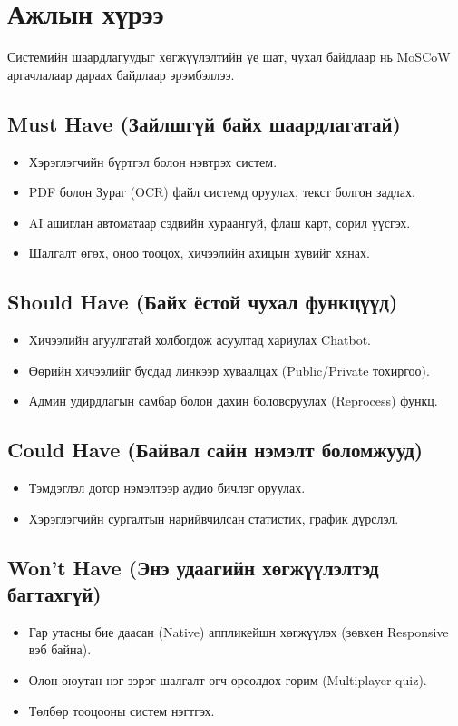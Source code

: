 \section{Ажлын хүрээ}
Системийн шаардлагуудыг хөгжүүлэлтийн үе шат, чухал байдлаар нь MoSCoW аргачлалаар дараах байдлаар эрэмбэллээ.

\subsection{Must Have (Зайлшгүй байх шаардлагатай)}
\begin{itemize}
    \item Хэрэглэгчийн бүртгэл болон нэвтрэх систем.
    \item PDF болон Зураг (OCR) файл системд оруулах, текст болгон задлах.
    \item AI ашиглан автоматаар сэдвийн хураангуй, флаш карт, сорил үүсгэх.
    \item Шалгалт өгөх, оноо тооцох, хичээлийн ахицын хувийг хянах.
\end{itemize}

\subsection{Should Have (Байх ёстой чухал функцүүд)}
\begin{itemize}
    \item Хичээлийн агуулгатай холбогдож асуултад хариулах Chatbot.
    \item Өөрийн хичээлийг бусдад линкээр хуваалцах (Public/Private тохиргоо).
    \item Админ удирдлагын самбар болон дахин боловсруулах (Reprocess) функц.
\end{itemize}

\subsection{Could Have (Байвал сайн нэмэлт боломжууд)}
\begin{itemize}
    \item Тэмдэглэл дотор нэмэлтээр аудио бичлэг оруулах.
    \item Хэрэглэгчийн сургалтын нарийвчилсан статистик, график дүрслэл.
\end{itemize}

\subsection{Won't Have (Энэ удаагийн хөгжүүлэлтэд багтахгүй)}
\begin{itemize}
    \item Гар утасны бие даасан (Native) аппликейшн хөгжүүлэх (зөвхөн Responsive вэб байна).
    \item Олон оюутан нэг зэрэг шалгалт өгч өрсөлдөх горим (Multiplayer quiz).
    \item Төлбөр тооцооны систем нэгтгэх.
\end{itemize}

